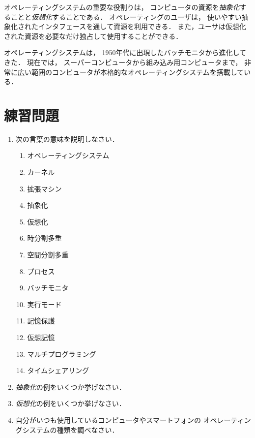 オペレーティングシステムの重要な役割りは，
コンピュータの資源を\emph{抽象化}することと\emph{仮想化}することである．
オペレーティングのユーザは，
使いやすい抽象化されたインタフェースを通して資源を利用できる．
また，ユーサは仮想化された資源を必要なだけ独占して使用することができる．

オペレーティングシステムは，
1950年代に出現したバッチモニタから進化してきた．
現在では，
スーパーコンピュータから組み込み用コンピュータまで，
非常に広い範囲のコンピュータが本格的なオペレーティングシステムを搭載している．

\section*{練習問題}
\begin{enumerate}
  \renewcommand{\labelenumi}{\ttfamily\arabic{chapter}.\arabic{enumi}}
  \setlength{\leftskip}{1em}
\item 次の言葉の意味を説明しなさい．
  \begin{enumerate}
    \item オペレーティングシステム
    \item カーネル
    \item 拡張マシン
    \item 抽象化
    \item 仮想化
    \item 時分割多重
    \item 空間分割多重
    \item プロセス
    \item バッチモニタ
    \item 実行モード
    \item 記憶保護
    \item 仮想記憶
    \item マルチプログラミング
    \item タイムシェアリング
  \end{enumerate}
\item \emph{抽象化}の例をいくつか挙げなさい．
\item \emph{仮想化}の例をいくつか挙げなさい．
\item 自分がいつも使用しているコンピュータやスマートフォンの
  オペレーティングシステムの種類を調べなさい．
\end{enumerate}
